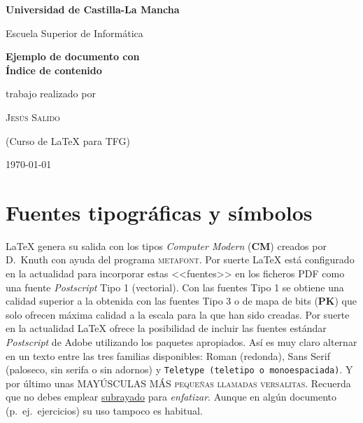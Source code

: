 \documentclass[ 		%
	11pt,				%
	a4paper,			%
	twoside,			%
	openright,			%
	final       		%
]{book}
\begin{document}
\frontmatter


\begin{titlepage}
    \begin{center}
    	\LARGE
    	{\bfseries Universidad de Castilla-La Mancha\par}
    	Escuela Superior de Informática\par
    	\vspace{4cm}
    	{\huge\bfseries Ejemplo de documento con \\
                        Índice de contenido\par}
    	{\small \phantom{(Portada 5)}}
    	\vspace{3cm}
    	\par
    \end{center}
	\hfill\begin{minipage}{.5\linewidth}
		\normalsize
		trabajo realizado por\par
		\textsc{Jesús Salido}\par
        (Curso de \LaTeX{} para TFG)
	\end{minipage}
	\vfill
	\centering	\today
\end{titlepage}

\cleardoublepage
\setcounter{tocdepth}{1} %
\tableofcontents
\listoffigures
\listoftables


\mainmatter

\chapter{Fuentes tipográficas y símbolos}
\LaTeX{} genera su salida con los tipos \emph{Computer Modern} (\textbf{CM}) creados por D.~Knuth con ayuda del programa \textsc{metafont}. Por suerte \LaTeX{} está configurado en la actualidad para incorporar estas <<fuentes>> en los ficheros PDF como una fuente \emph{Postscript} Tipo 1 (vectorial). Con las fuentes Tipo 1 se obtiene una calidad superior a la obtenida con las fuentes Tipo 3 o de mapa de bits (\textbf{PK}) que solo ofrecen máxima calidad a la escala para la que han sido creadas. Por suerte en la actualidad \LaTeX{} ofrece la posibilidad de incluir las fuentes estándar \emph{Postscript} de \textsf{Adobe} utilizando los paquetes apropiados. Así es muy claro alternar en un texto entre las tres familias disponibles: Roman (redonda), \textsf{Sans Serif (paloseco, sin serifa o sin adornos)} y \texttt{Teletype (teletipo o monoespaciada)}. Y por último unas MAYÚSCULAS MÁS \textsc{pequeñas llamadas versalitas}. Recuerda que no debes emplear \underline{subrayado} para \emph{enfatizar}. Aunque en algún documento (p.~ej.\ ejercicios) su uso tampoco es habitual.
\end{document}
